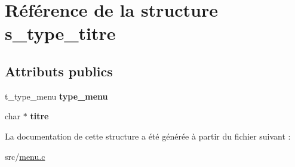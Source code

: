\hypertarget{structs__type__titre}{}\section{Référence de la structure s\+\_\+type\+\_\+titre}
\label{structs__type__titre}
\subsection*{Attributs publics}
\begin{DoxyCompactItemize}
\item 
\mbox{\label{structs__type__titre_a446bba760ca5fbff1f4be0a92c0e60f4}} 
t\+\_\+type\+\_\+menu {\bfseries type\+\_\+menu}
\item 
\mbox{\label{structs__type__titre_aa574afa56ecbee3aedfd48d6bfe22ffd}} 
char $\ast$ {\bfseries titre}
\end{DoxyCompactItemize}


La documentation de cette structure a été générée à partir du fichier suivant \+:\begin{DoxyCompactItemize}
\item 
src/\hyperlink{menu_8c}{menu.\+c}\end{DoxyCompactItemize}
